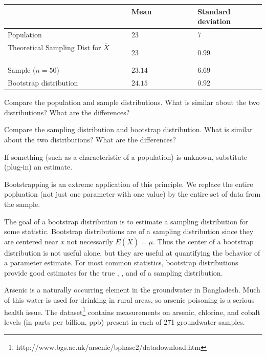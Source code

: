 \begin{center}
\begin{tabular}{lll}
\hline
 & Mean \ \ \ \ \ \ \ \ \ \ & Standard deviation \\
 \hline
Population & 23 & 7 \\
Theoretical Sampling Dist for $\bar{X}$ \ \ \ \ \ \ \ \ \ \ & 23 & $0.99$ \\
Sample ($n=50$) & $23.14$ & $6.69$ \\
Bootstrap distribution & $24.15$ & $0.92$\\
\hline
\end{tabular}
\end{center}


\bb[resume]
\ii Compare the population and sample distributions. What is similar about the two distributions? What are the differences? \vfill

\ii Compare the sampling distribution and bootstrap distribution. What is similar about the two distributions? What are the differences?
\vfill
\ee

\clearpage


 \bbox
\textbf{} If something (such as a characteristic of a population) is unknown, substitute (plug-in) an estimate.\medskip

Bootstrapping is an extreme application of this principle. We replace the entire popluation (not just one parameter with one value) by the entire set of data from the sample.
\ebox

\bbox
\bi
\ii The goal of a bootstrap distribution is to estimate a sampling distribution for some statistic.
\ii Bootstrap distributions are \textbf{} of a sampling distribution since they are centered near $\bar{x}$ not necessarily $E(\overline{X}) = \mu$. %
\ii Thus the center of a bootstrap distribution is not useful alone, but they are useful at quantifying the behavior of a parameter estimate. %
\ii For most common statistics, bootstrap distributions provide good estimates for the true \textbf{}, \textbf{}, and \textbf{} of a sampling distribution.
\ei
\ebox

\bb[resume]
\ii Arsenic is a naturally occurring element in the groundwater in Bangladesh. Much of this water is used for drinking in rural areas,
so arsenic poisoning is a serious health issue. The dataset\footnote{http://www.bgs.ac.uk/arsenic/bphase2/datadownload.htm} \textit{\textbf{}} contains measurements on arsenic, chlorine, and cobalt levels (in parts per billion, ppb) present in each of 271 groundwater samples.\label{q:arsenic}

